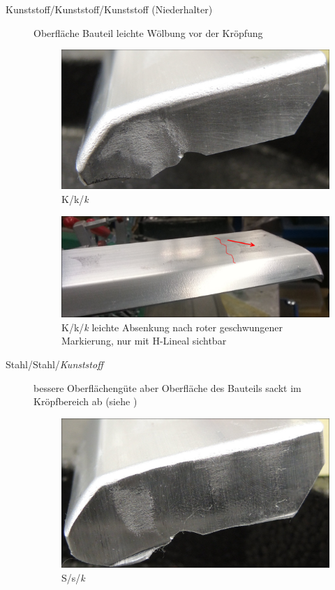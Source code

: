 \documentclass[12pt,a4paper,parskip]{scrartcl}
\begin{document}
\begin{description}
\item[Kunststoff/Kunststoff/Kunststoff (Niederhalter)] Oberfläche Bauteil leichte Wölbung vor der Kröpfung
\begin{figure}[H]
\centering
\includegraphics[width=.8\textwidth]{Kkk1}
\caption{K/k/\emph{k}}
\label{fig:Kkk1}
\end{figure}
\begin{figure}[H]
\centering
\includegraphics[width=.8\textwidth]{BauteilAbsenkSk3}
\caption{K/k/\emph{k} leichte Absenkung nach roter geschwungener Markierung, nur mit H-Lineal sichtbar}
\label{fig:sKs3}
\end{figure}

\item[Stahl/Stahl/\emph{Kunststoff}] bessere Oberflächengüte aber Oberfläche des Bauteils sackt im Kröpfbereich ab (siehe )
\begin{figure}[H]
\centering
\includegraphics[width=.8\textwidth]{Ssk1}
\caption{S/s/\emph{k}}
\label{fig:Ssk1}
\end{figure}











\end{description}
\end{document}
